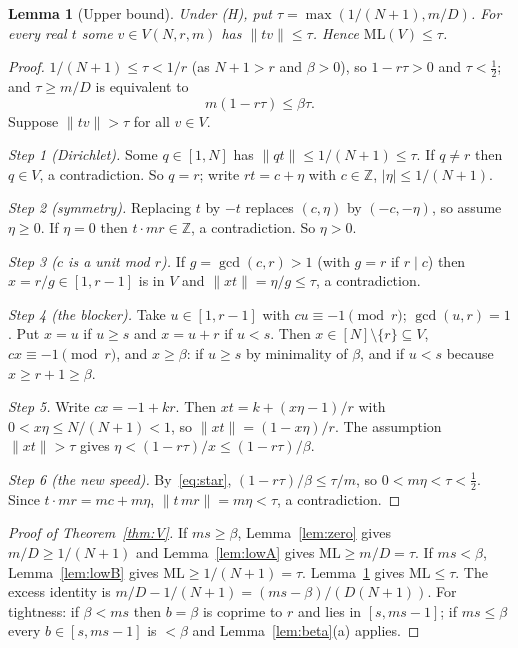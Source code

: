 \documentclass[11pt]{article}
\newtheorem{lemma}[theorem]{Lemma}
\theoremstyle{definition}
\theoremstyle{remark}
\newcommand{\nd}[1]{\lVert #1\rVert}
\newcommand{\ML}{\mathrm{ML}}
\newcommand{\ZZ}{\mathbb{Z}}
\begin{document}
\begin{lemma}[Upper bound]\label{lem:upper}
Under (H), put $\tau=\max(1/(N+1),m/D)$. For every real $t$ some $v\in V(N,r,m)$ has $\nd{tv}\le\tau$. Hence $\ML(V)\le\tau$.
\end{lemma}
\begin{proof}
$1/(N+1)\le\tau<1/r$ (as $N+1>r$ and $\beta>0$), so $1-r\tau>0$ and $\tau<\frac12$; and $\tau\ge m/D$ is equivalent to
\begin{equation}\label{eq:star}
m(1-r\tau)\le\beta\tau.
\end{equation}
Suppose $\nd{tv}>\tau$ for all $v\in V$.

\emph{Step 1 (Dirichlet).} Some $q\in[1,N]$ has $\nd{qt}\le1/(N+1)\le\tau$. If $q\ne r$ then $q\in V$, a contradiction. So $q=r$; write $rt=c+\eta$ with $c\in\ZZ$, $|\eta|\le1/(N+1)$.

\emph{Step 2 (symmetry).} Replacing $t$ by $-t$ replaces $(c,\eta)$ by $(-c,-\eta)$, so assume $\eta\ge0$. If $\eta=0$ then $t\cdot mr\in\ZZ$, a contradiction. So $\eta>0$.

\emph{Step 3 ($c$ is a unit mod $r$).} If $g=\gcd(c,r)>1$ (with $g=r$ if $r\mid c$) then $x=r/g\in[1,r-1]$ is in $V$ and $\nd{xt}=\eta/g\le\tau$, a contradiction.

\emph{Step 4 (the blocker).} Take $u\in[1,r-1]$ with $cu\equiv-1\pmod r$; $\gcd(u,r)=1$. Put $x=u$ if $u\ge s$ and $x=u+r$ if $u<s$. Then $x\in[N]\setminus\{r\}\subseteq V$, $cx\equiv-1\pmod r$, and $x\ge\beta$: if $u\ge s$ by minimality of $\beta$, and if $u<s$ because $x\ge r+1\ge\beta$.

\emph{Step 5.} Write $cx=-1+kr$. Then $xt=k+(x\eta-1)/r$ with $0<x\eta\le N/(N+1)<1$, so $\nd{xt}=(1-x\eta)/r$. The assumption $\nd{xt}>\tau$ gives $\eta<(1-r\tau)/x\le(1-r\tau)/\beta$.

\emph{Step 6 (the new speed).} By~\eqref{eq:star}, $(1-r\tau)/\beta\le\tau/m$, so $0<m\eta<\tau<\frac12$. Since $t\cdot mr=mc+m\eta$, $\nd{t\,mr}=m\eta<\tau$, a contradiction.
\end{proof}

\begin{proof}[Proof of Theorem~\ref{thm:V}]
If $ms\ge\beta$, Lemma~\ref{lem:zero} gives $m/D\ge1/(N+1)$ and Lemma~\ref{lem:lowA} gives $\ML\ge m/D=\tau$. If $ms<\beta$, Lemma~\ref{lem:lowB} gives $\ML\ge1/(N+1)=\tau$. Lemma~\ref{lem:upper} gives $\ML\le\tau$. The excess identity is $m/D-1/(N+1)=(ms-\beta)/(D(N+1))$. For tightness: if $\beta<ms$ then $b=\beta$ is coprime to $r$ and lies in $[s,ms-1]$; if $ms\le\beta$ every $b\in[s,ms-1]$ is $<\beta$ and Lemma~\ref{lem:beta}(a) applies.
\end{proof}
\end{document}
